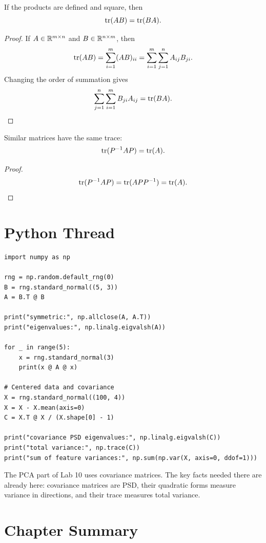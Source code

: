 \begin{proposition}
If the products are defined and square, then
\[
  \operatorname{tr}(AB)=\operatorname{tr}(BA).
\]
\end{proposition}

\begin{proof}
If $A\in\mathbb{R}^{m\times n}$ and $B\in\mathbb{R}^{n\times m}$, then
\[
  \operatorname{tr}(AB)
  =
  \sum_{i=1}^m (AB)_{ii}
  =
  \sum_{i=1}^m\sum_{j=1}^n A_{ij}B_{ji}.
\]
Changing the order of summation gives
\[
  \sum_{j=1}^n\sum_{i=1}^m B_{ji}A_{ij}
  =
  \operatorname{tr}(BA).
\]
\end{proof}

\begin{corollary}
Similar matrices have the same trace:
\[
  \operatorname{tr}(P^{-1}AP)=\operatorname{tr}(A).
\]
\end{corollary}

\begin{proof}
\[
  \operatorname{tr}(P^{-1}AP)=\operatorname{tr}(APP^{-1})=\operatorname{tr}(A).
\]
\end{proof}

\section{Python Thread}

\begin{lstlisting}
import numpy as np

rng = np.random.default_rng(0)
B = rng.standard_normal((5, 3))
A = B.T @ B

print("symmetric:", np.allclose(A, A.T))
print("eigenvalues:", np.linalg.eigvalsh(A))

for _ in range(5):
    x = rng.standard_normal(3)
    print(x @ A @ x)

# Centered data and covariance
X = rng.standard_normal((100, 4))
X = X - X.mean(axis=0)
C = X.T @ X / (X.shape[0] - 1)

print("covariance PSD eigenvalues:", np.linalg.eigvalsh(C))
print("total variance:", np.trace(C))
print("sum of feature variances:", np.sum(np.var(X, axis=0, ddof=1)))
\end{lstlisting}

\begin{labbox}
The PCA part of Lab 10 uses covariance matrices. The key facts needed there
are already here: covariance matrices are PSD, their quadratic forms measure
variance in directions, and their trace measures total variance.
\end{labbox}

\section*{Chapter Summary}

